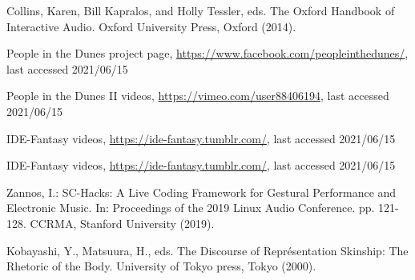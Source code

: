 \documentclass[runningheads,a4paper]{llncs}
\begin{document}


\begin{thebibliography}{4}

 Collins, Karen, Bill Kapralos, and Holly Tessler, eds. The Oxford Handbook of Interactive Audio. Oxford University Press, Oxford (2014).

 People in the Dunes project page,  \url{https://www.facebook.com/peopleinthedunes/}, last accessed 2021/06/15

 People in the Dunes II videos, \url{https://vimeo.com/user88406194}, last accessed 2021/06/15

 IDE-Fantasy videos, \url{https://ide-fantasy.tumblr.com/}, last accessed 2021/06/15
 
 IDE-Fantasy videos, \url{https://ide-fantasy.tumblr.com/}, last accessed 2021/06/15

 Zannos, I.: SC-Hacks: A Live Coding Framework for Gestural Performance and Electronic Music. In: Proceedings of the 2019 Linux Audio Conference. pp. 121-128. CCRMA, Stanford University (2019).

 Kobayashi, Y., Matsuura, H., eds. The Discourse of Repr\'esentation Skinship: The Rhetoric of the Body. University of Tokyo press, Tokyo (2000).
\end{thebibliography}
\end{document}
